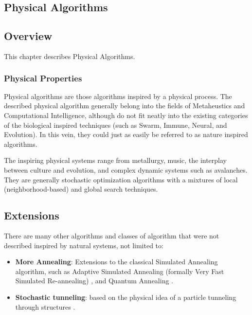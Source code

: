 

\renewcommand{\bibsection}{\subsection{\bibname}}
\begin{bibunit}

\chapter{Physical Algorithms}
\label{ch:physical}

\section{Overview}
This chapter describes Physical Algorithms.


\subsection{Physical Properties}
Physical algorithms are those algorithms inspired by a physical process. The described physical algorithm generally belong into the fields of Metaheustics and Computational Intelligence, although do not fit neatly into the existing categories of the biological inspired techniques (such as Swarm, Immune, Neural, and Evolution). In this vein, they could just as easily be referred to as nature inspired algorithms.

The inspiring physical systems range from metallurgy, music, the interplay between culture and evolution, and complex dynamic systems such as avalanches. They are generally stochastic optimization algorithms with a mixtures of local (neighborhood-based) and global search techniques.

% 
% 
\section{Extensions}
There are many other algorithms and classes of algorithm that were not described inspired by natural systems, not limited to:

\begin{itemize}
	\item \textbf{More Annealing}: Extensions to the classical Simulated Annealing algorithm, such as Adaptive Simulated Annealing (formally Very Fast Simulated Re-annealing) \cite{Ingber1989, Ingber1996}, and Quantum Annealing \cite{Apolloni1989, Das2005}.
	\item \textbf{Stochastic tunneling}: based on the physical idea of a particle tunneling through structures \cite{Wenzel1999}.
\end{itemize}

\putbib
\end{bibunit}

